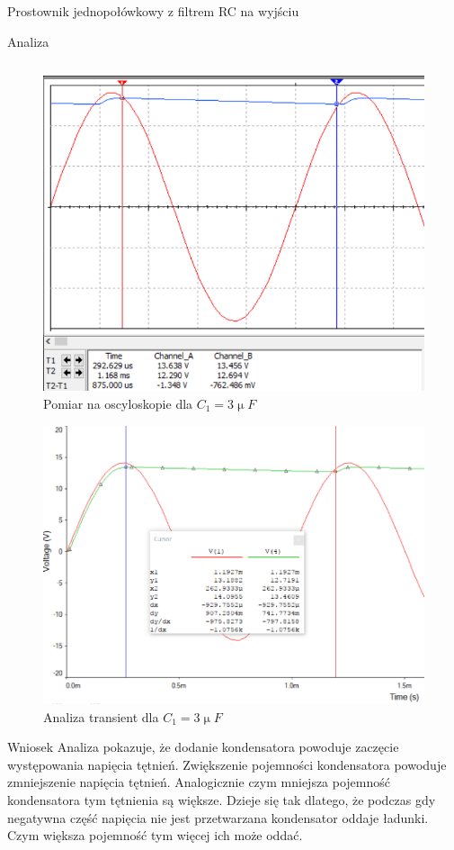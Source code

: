 \documentclass[a4paper]{scrartcl}
\begin{document}
\begin{section}{Prostownik jednopołówkowy z filtrem RC na wyjściu}
\begin{subsection}{Analiza}
\begin{table}[ht]
\begin{center}
\begin{tabular}{| >{\bfseries}p{4.5cm} | l | l | l | l |}
					\end{tabular}
					\end{center}
				\end{table}
				\pagebreak
				\begin{figure}[h]
				\begin{center}
					\includegraphics[width=0.6\linewidth,scale=2]{exercise-2-osciloscope}
					\caption{Pomiar na oscyloskopie dla $C_{1} = 3\upmu F$}
					\label{fig:circuit-2-osc}
				\end{center}
				\end{figure}
				\begin{figure}[!ht]
				\begin{center}
					\includegraphics[width=0.8\linewidth,scale=2]{exercise-2-transient}
					\caption{Analiza transient dla $C_{1} = 3\upmu F$}
					\label{fig:circuit-2-transient}
				\end{center}
				\end{figure}
		\end{subsection}
		\begin{subsection}{Wniosek}
			Analiza pokazuje, że dodanie kondensatora powoduje zaczęcie występowania napięcia tętnień. Zwiększenie pojemności kondensatora powoduje zmniejszenie napięcia tętnień. Analogicznie czym mniejsza pojemność kondensatora tym tętnienia są większe. Dzieje się tak dlatego, że podczas gdy negatywna część napięcia nie jest przetwarzana kondensator oddaje ładunki. Czym większa pojemność tym więcej ich może oddać.
		\end{subsection}
	\end{section}
\end{document}
